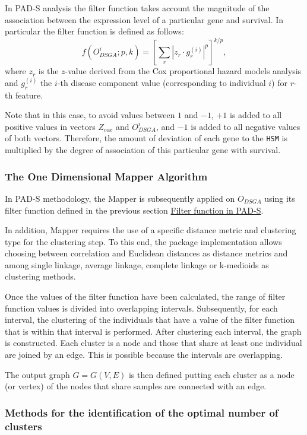 In PAD-S analysis the filter function takes account the magnitude of the association between the expression level of a particular gene and survival. In particular the filter function is defined as follows:
\[f(O_{DSGA}^i;p,k) = \left[\sum_r |z_{r}\cdot g_{r}^{(i)}|^p \right]^{k/p},\]
where \(z_{r}\) is the \(z\)-value derived from the Cox proportional hazard models analysis and \(g_r^{(i)}\) the \(i\)-th disease component value (corresponding to individual \(i\)) for \(r\)-th feature.

Note that in this case, to avoid values between \(1\) and \(-1\), \(+1\) is added to all positive values in vectors \(Z_{cox}\) and \(O_{DSGA}^{i}\), and \(-1\) is added to all negative values of both vectors. Therefore, the amount of deviation of each gene to the \texttt{HSM} is multiplied by the degree of association of this particular gene with survival.

\hypertarget{section2.3.2}{%
\subsubsection{The One Dimensional Mapper Algorithm}\label{section2.3.2}}

In PAD-S methodology, the Mapper is subsequently applied on \(O_{DSGA}\) using its filter function defined in the previous section \protect\hyperlink{section2.3.1}{Filter function in PAD-S}.

In addition, Mapper requires the use of a specific distance metric and clustering type for the clustering step.
To this end, the  package implementation allows choosing between correlation and Euclidean distances as distance metrics and among single linkage, average linkage, complete linkage or k-medioids as clustering methods.

Once the values of the filter function have been calculated, the range of filter function values is divided into overlapping intervals. Subsequently, for each interval, the clustering of the individuals that have a value of the filter function that is within that interval is performed. After clustering each interval, the graph is constructed. Each cluster is a node and those that share at least one individual are joined by an edge. This is possible because the intervals are overlapping.

The output graph \(G=G(V,E)\) is then defined putting each cluster as a node (or vertex) of the nodes that share samples are connected with an edge.

\hypertarget{section2.3.3}{%
\subsubsection{Methods for the identification of the optimal number of clusters}\label{section2.3.3}}

